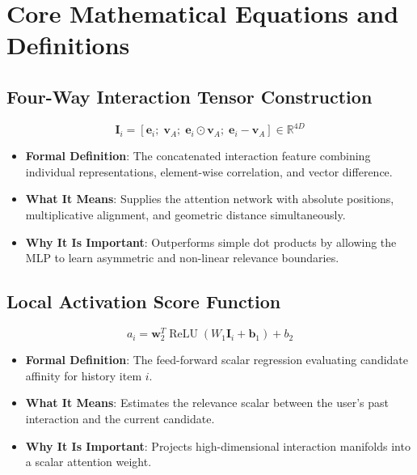 \documentclass[11pt,a4paper]{article}
\theoremstyle{definition}
\begin{document}
\section{Core Mathematical Equations and Definitions}

\subsection{Four-Way Interaction Tensor Construction}
{\boldmath
\begin{equation}
\mathbf{I}_i = \left[ \mathbf{e}_i; \; \mathbf{v}_A; \; \mathbf{e}_i \odot \mathbf{v}_A; \; \mathbf{e}_i - \mathbf{v}_A \right] \in \mathbb{R}^{4D}
\end{equation}
}
\begin{itemize}
    \item \textbf{Formal Definition}: The concatenated interaction feature combining individual representations, element-wise correlation, and vector difference.
    \item \textbf{What It Means}: Supplies the attention network with absolute positions, multiplicative alignment, and geometric distance simultaneously.
    \item \textbf{Why It Is Important}: Outperforms simple dot products by allowing the MLP to learn asymmetric and non-linear relevance boundaries.
\end{itemize}

\subsection{Local Activation Score Function}
{\boldmath
\begin{equation}
a_i = \mathbf{w}_2^T \operatorname{ReLU}\left( W_1 \mathbf{I}_i + \mathbf{b}_1 \right) + b_2
\end{equation}
}
\begin{itemize}
    \item \textbf{Formal Definition}: The feed-forward scalar regression evaluating candidate affinity for history item $i$.
    \item \textbf{What It Means}: Estimates the relevance scalar between the user's past interaction and the current candidate.
    \item \textbf{Why It Is Important}: Projects high-dimensional interaction manifolds into a scalar attention weight.
\end{itemize}
\end{document}
